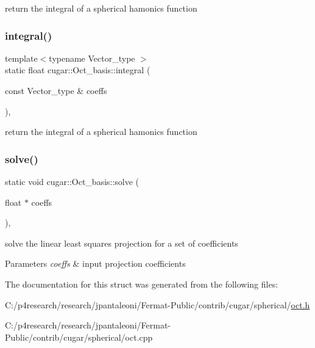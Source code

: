return the integral of a spherical hamonics function \mbox{\label{structcugar_1_1_oct__basis_ab86709e46d5c4fd8f3f6d0a5ef7eac7c}} 
\subsubsection{\texorpdfstring{integral()}{integral()}\hspace{0.1cm}{\footnotesize\ttfamily [2/2]}}
{\footnotesize\ttfamily template$<$typename Vector\+\_\+type $>$ \\
static float cugar\+::\+Oct\+\_\+basis\+::integral (\begin{DoxyParamCaption}\item[{const Vector\+\_\+type \&}]{coeffs }\end{DoxyParamCaption})\hspace{0.3cm}{\ttfamily [inline]}, {\ttfamily [static]}}

return the integral of a spherical hamonics function \mbox{\label{structcugar_1_1_oct__basis_aa7178c4ee1c614fa880fdcbaea87f9e7}} 
\subsubsection{\texorpdfstring{solve()}{solve()}}
{\footnotesize\ttfamily static void cugar\+::\+Oct\+\_\+basis\+::solve (\begin{DoxyParamCaption}\item[{float $\ast$}]{coeffs }\end{DoxyParamCaption})\hspace{0.3cm}{\ttfamily [inline]}, {\ttfamily [static]}}

solve the linear least squares projection for a set of coefficients


\begin{DoxyParams}{Parameters}
{\em coeffs} & input projection coefficients \\
\hline
\end{DoxyParams}


The documentation for this struct was generated from the following files\+:\begin{DoxyCompactItemize}
\item 
C\+:/p4research/research/jpantaleoni/\+Fermat-\/\+Public/contrib/cugar/spherical/\hyperlink{oct_8h}{oct.\+h}\item 
C\+:/p4research/research/jpantaleoni/\+Fermat-\/\+Public/contrib/cugar/spherical/oct.\+cpp\end{DoxyCompactItemize}
